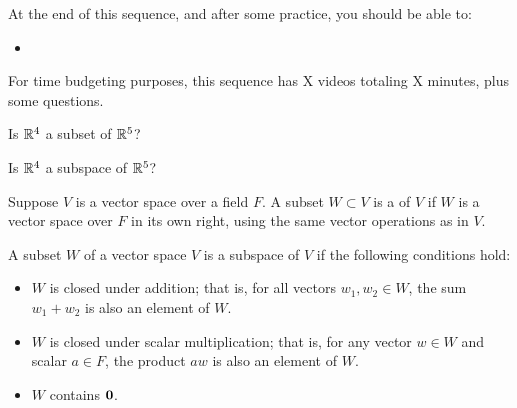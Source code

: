 







At the end of this sequence, and after some practice, you should be able to:

\begin{itemize}
\item 


\end{itemize}


For time budgeting purposes, this sequence has X videos totaling X minutes, 
plus some questions.  




\endedxtext

\endedxvertical








Is $\mathbb R^4$ a subset of $\mathbb R^5$?  



Is $\mathbb R^4$ a subspace of $\mathbb R^5$?  



\edXsolution{
}

\endedxproblem

\endedxvertical






{}  
Suppose $V$ is a vector space over a field $F$.  A subset $W \subset V$ is a {}  
of $V$ if $W$ is a vector space over $F$ in its own right, using the same vector operations as in $V$.  

{}  
A subset $W$ of a vector space $V$ is a subspace of $V$ if the following conditions hold:
\begin{itemize}
\item
$W$ is closed under addition; that is, for all vectors $w_1,w_2 \in W$, the sum $w_1+w_2$ is also an
element of $W$.  
\item
$W$ is closed under scalar multiplication; that is, for any vector $w\in W$ and scalar $a \in F$, the
product $aw$ is also an element of $W$.  
\item
$W$ contains $\mathbf{0}$.  
\end{itemize}




